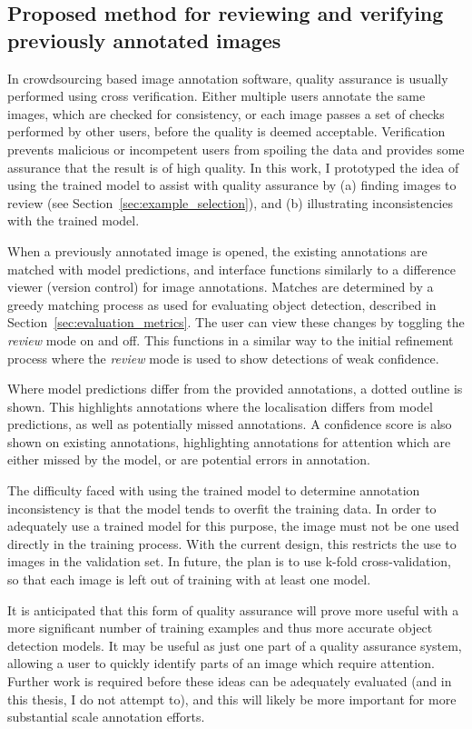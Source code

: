 \subsection{Proposed method for reviewing and verifying previously annotated images}
\label{sec:reviewing}

In crowdsourcing based image annotation software, quality assurance is usually performed using cross verification. Either multiple users annotate the same images, which are checked for consistency, or each image passes a set of checks performed by other users, before the quality is deemed acceptable. Verification prevents malicious or incompetent users from spoiling the data and provides some assurance that the result is of high quality. In this work, I prototyped the idea of using the trained model to assist with quality assurance by (a) finding images to review (see Section~\ref{sec:example_selection}), and (b) illustrating inconsistencies with the trained model.

When a previously annotated image is opened, the existing annotations are matched with model predictions, and interface functions similarly to a difference viewer (version control) for image annotations. Matches are determined by a greedy matching process as used for evaluating object detection, described in Section~\ref{sec:evaluation_metrics}. The user can view these changes by toggling the \emph{review} mode on and off. This functions in a similar way to the initial refinement process where the \emph{review} mode is used to show detections of weak confidence. 

Where model predictions differ from the provided annotations, a dotted outline is shown. This highlights annotations where the localisation differs from model predictions, as well as potentially missed annotations. A confidence score is also shown on existing annotations, highlighting annotations for attention which are either missed by the model, or are potential errors in annotation.

The difficulty faced with using the trained model to determine annotation inconsistency is that the model tends to overfit the training data. In order to adequately use a trained model for this purpose, the image must not be one used directly in the training process. With the current design, this restricts the use to images in the validation set. In future, the plan is to use k-fold cross-validation, so that each image is left out of training with at least one model. 

It is anticipated that this form of quality assurance will prove more useful with a more significant number of training examples and thus more accurate object detection models. It may be useful as just one part of a quality assurance system, allowing a user to quickly identify parts of an image which require attention. Further work is required before these ideas can be adequately evaluated (and in this thesis, I do not attempt to), and this will likely be more important for more substantial scale annotation efforts.

